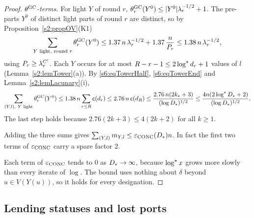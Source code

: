 \begin{proof}
\emph{$\theta^{\mathrm{GC}}$-terms.} For light $Y$ of round $r$, $\theta^{\mathrm{GC}}_r(Y^0)\le|Y^0|\lambda_r^{-1/2}+1$. The pre-parts $Y^0$ of distinct light parts of round $r$ are distinct, so by Proposition~\ref{s2:propOV}(K1)
\[
\sum_{Y\text{ light, round }r}\theta^{\mathrm{GC}}_r(Y^0)\le1.37\,n\,\lambda_r^{-1/2}+1.37\,\frac n{P_r}\le1.38\,n\,\lambda_r^{-1/2},
\]
using $P_r\ge\lambda_r^{C'}$. Each $Y$ occurs for at most $R-r-1\le2\log^{\star} d_r+1$ values of $l$ (Lemma~\ref{s2:lemTower}(a)). By \eqref{s6:eqTowerHalf}, \eqref{s6:eqTowerEnd} and Lemma~\ref{s2:lemLacunary}(i),
\[
\sum_{(Y,l),\ Y\text{ light}}\theta^{\mathrm{GC}}_r(Y^0)\le1.38\,n\sum_{r\le R}\mathsf c(d_r)\le2.76\,n\,\mathsf c(d_R)\le\frac{2.76\,n(2k_*+3)}{(\log D_{*})^{1/2}}\le\frac{4n(2\log^{\star}D_{*}+2)}{(\log D_{*})^{1/2}}.
\]
The last step holds because $2.76(2k+3)\le4(2k+2)$ for all $k\ge1$.

Adding the three sums gives $\sum_{(Y,l)}m_{Y,l}\le\varepsilon_{\mathrm{CONC}}(D_{*})n$. In fact the first two terms of $\varepsilon_{\mathrm{CONC}}$ carry a spare factor $2$.

Each term of $\varepsilon_{\mathrm{CONC}}$ tends to $0$ as $D_{*}\to\infty$, because $\log^{\star} x$ grows more slowly than every iterate of $\log$. The bound uses nothing about $\delta$ beyond $u\in V(Y(u))$, so it holds for every designation.
\end{proof}

\subsection{Lending statuses and lost ports}

